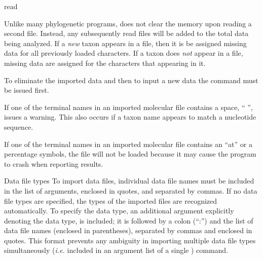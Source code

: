 \begin{command}{read}{}
\begin{poydescription}
        \begin{statement}
           \setlength{\parindent}{0.5cm}
            Unlike many phylogenetic programs, \poy does not clear the memory
            upon reading a second file. Instead, any subsequently read files
            will be added to the total data being analyzed.  If a \emph{new} taxon
            appears in a file, then it is be assigned missing data for all
            previously loaded characters. If a taxon does \emph{not} appear in a
            file, missing data are assigned for the characters that appearing in it. 
            
            \indent To eliminate the imported data and then to input a new data
            the  command must be issued
            first. 
        \end{statement}
        
        \begin{statement}
           \setlength{\parindent}{0.5cm}
             If one of the terminal names in an imported molecular file contains
             a space, `` '', \poy issues a warning. This also occurs if a
             taxon name appears to match a nucleotide sequence.

             \indent If one of the terminal names in an imported molecular file contains
             an ``at'' or a percentage symbols, the file will not be loaded because
             it may cause the program to crash when reporting results.
         \end{statement}
	\end{poydescription}

	\begin{arguments}

	  \begin{argumentgroup}{Data file types}
	  To import data files, individual data file names must be included in the list of
	   arguments, enclosed in quotes, and separated
	  by commas. If no data file types are specified, the types of the imported
	  files are recognized automatically. To specify the data type,
	  an additional argument explicitly denoting the data type,
	  is included; it is followed by a colon (``:'') and the
	  list of data file names (enclosed in parentheses), separated by commas and enclosed in quotes. This
	  format prevents any ambiguity in importing multiple data file types
	  simultaneously (\emph{i.e.} included in an argument list of a single )
	  command.


\end{argumentgroup}
\end{arguments}
\end{command}
